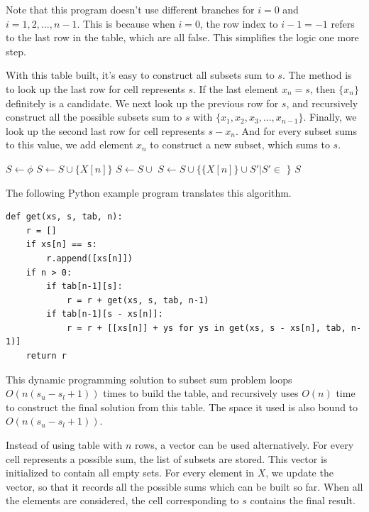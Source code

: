 \documentclass[UTF8]{article}
\begin{document}
Note that this program doesn't use different branches for $i = 0$ and $i = 1, 2, ..., n-1$. This
is because when $i = 0$, the row index to $i - 1 = -1$ refers to the last row in the table, which are
all false. This simplifies the logic one more step.

With this table built, it's easy to construct all subsets sum to $s$. The method is to look up
the last row for cell represents $s$. If the last element $x_n = s$, then $\{x_n\}$ definitely
is a candidate. We next look up the previous row for $s$, and recursively construct all the
possible subsets sum to $s$ with $\{x_1, x_2, x_3, ..., x_{n-1}\}$. Finally, we look up
the second last row for cell represents $s - x_n$. And for every subset sums to this value,
we add element $x_n$ to construct a new subset, which sums to $s$.

\begin{algorithmic}[1]
  \State $S \gets \phi$
    \State $S \gets S \cup \{X[n]\}$
  \EndIf
      \State $S \gets S \cup $ 
    \EndIf
      \State $S \gets S \cup \{\{X[n]\} \cup S' | S' \in $  $\}$
    \EndIf
  \EndIf
  \State \Return $S$
\EndFunction
\end{algorithmic}

The following Python example program translates this algorithm.

\lstset{language=Python}
\begin{lstlisting}
def get(xs, s, tab, n):
    r = []
    if xs[n] == s:
        r.append([xs[n]])
    if n > 0:
        if tab[n-1][s]:
            r = r + get(xs, s, tab, n-1)
        if tab[n-1][s - xs[n]]:
            r = r + [[xs[n]] + ys for ys in get(xs, s - xs[n], tab, n-1)]
    return r
\end{lstlisting}

This dynamic programming solution to subset sum problem loops $O(n(s_u - s_l + 1))$ times
to build the table, and recursively uses $O(n)$ time to construct the final solution from this table.
The space it used is also bound to $O(n(s_u - s_l + 1))$.

Instead of using table with $n$ rows, a vector can be used alternatively. For every cell
represents a possible sum, the list of subsets are stored. This vector is initialized to contain
all empty sets. For every element in $X$, we update the vector, so that it records all the possible
sums which can be built so far. When all the elements are considered, the cell corresponding
to $s$ contains the final result.
\end{document}

